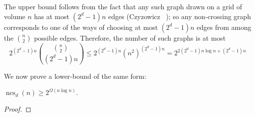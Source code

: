 \documentclass{patmorin}
\DeclareMathOperator{\ncs}{ncs}
\begin{document}
The upper bound follows from the fact that any such graph drawn on
a grid of volume $n$ has at most $(2^d-1)n$ edges (Czyzowicz \etal\
\cite[Lemma Y]{X}); so any non-crossing graph corresponds to one of the
ways of choosing at most $(2^d-1)n$ edges from among the $\binom{n}{2}$
possible edges.  Therefore, the number of such graphs is at most
\[
    2^{(2^d-1)n}\binom{\binom{n}{2}}{(2^d-1)n} \le 2^{(2^d-1)n} (n^{2})^{(2^d-1)n} = 2^{2(2^d-1)n\log n+(2^d-1)n}
\]

We now prove a lower-bound of the same form:
\begin{thm}
  $\ncs_d(n) \ge 2^{\Omega(n\log n)}$.
\end{thm}

\begin{proof}
%
%
%

\end{proof}
\end{document}
